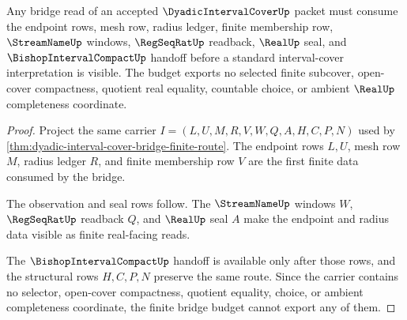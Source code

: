 \begin{theorem}
\label{thm:dyadic-interval-cover-finite-bridge-budget}
Any bridge read of an accepted $\DyadicIntervalCoverUp$ packet must consume the endpoint rows, mesh row, radius ledger, finite membership row, $\StreamNameUp$ windows, $\RegSeqRatUp$ readback, $\RealUp$ seal, and $\BishopIntervalCompactUp$ handoff before a standard interval-cover interpretation is visible. The budget exports no selected finite subcover, open-cover compactness, quotient real equality, countable choice, or ambient $\RealUp$ completeness coordinate.
\end{theorem}
\begin{proof}
Project the same carrier $I=(L,U,M,R,V,W,Q,A,H,C,P,N)$ used by \autoref{thm:dyadic-interval-cover-bridge-finite-route}. The endpoint rows $L,U$, mesh row $M$, radius ledger $R$, and finite membership row $V$ are the first finite data consumed by the bridge.

The observation and seal rows follow. The $\StreamNameUp$ windows $W$, $\RegSeqRatUp$ readback $Q$, and $\RealUp$ seal $A$ make the endpoint and radius data visible as finite real-facing reads.

The $\BishopIntervalCompactUp$ handoff is available only after those rows, and the structural rows $H,C,P,N$ preserve the same route. Since the carrier contains no selector, open-cover compactness, quotient equality, choice, or ambient completeness coordinate, the finite bridge budget cannot export any of them.
\end{proof}


